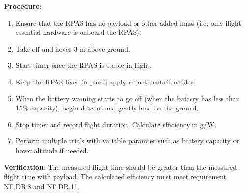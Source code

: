 \textbf{Procedure}:
\begin{enumerate}[noitemsep]
    \item Ensure that the RPAS has no payload or other added mass (i.e. only flight-essential hardware is onboard the RPAS).
    \item Take off and hover 3 m above ground.
    \item Start timer once the RPAS is stable in flight.
    \item Keep the RPAS fixed in place; apply adjustments if needed.
    \item When the battery warning starts to go off (when the battery has less than 15\% capacity), begin descent and gently land on the ground.
    \item Stop timer and record flight duration. Calculate efficiency in g/W.
    \item Perform multiple trials with variable paramter such as battery capacity or hover altitude if needed.
\end{enumerate}

\textbf{Verification}:
The measured flight time should be greater than the measured flight time with payload. The calculated efficiency must meet requirement NF.DR.8 and NF.DR.11.

\textbf{}
